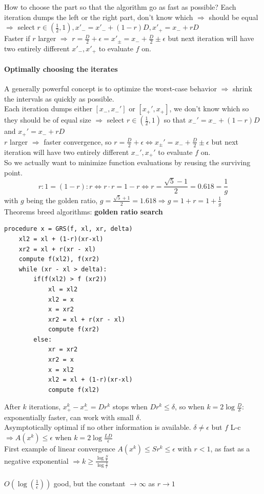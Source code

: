 \documentclass[10pt]{report}
\begin{document}
How to choose the part so that the algorithm go as fast as possible? Each iteration dumps the left or the right part, don't know which $\Rightarrow$ should be equal $\Rightarrow$ select $r \in (\frac{1}{2}, 1), x'_- = x'_- + (1 - r)D, x'_+ = x_- + rD$\\
Faster if $r$ larger $\Rightarrow$ $r = \frac{D}{2} + \epsilon = x'_\pm = x_- + \frac{D}{2} \pm \epsilon$ but next iteration will have two entirely different $x'_-, x'_+$ to evaluate $f$ on.
\paragraph{Optimally choosing the iterates} A generally powerful concept is to optimize the worst-case behavior $\Rightarrow$ shrink the intervals as quickly as possible.\\
Each iteration dumps either $[x_-, x_-']$ or $[x_+', x_+]$, we don't know which so they should be of equal size $\Rightarrow$ select $r\in (\frac{1}{2},1)$ so that $x_-' = x_- + (1-r)D$ and $x_+' = x_- + rD$\\
$r$ larger $\Rightarrow$ faster convergence, so $r = \frac{D}{2} + \epsilon \Leftrightarrow x_\pm' = x_- + \frac{D}{2}\pm\epsilon$ but next iteration will have two entirely different $x_-', x_+'$ to evaluate $f$ on.\\
So we actually want to minimize function evaluations by reusing the surviving point. $$r : 1 = (1 - r) : r \Leftrightarrow r\cdot r = 1 - r \Leftrightarrow r = \frac{\sqrt{5} - 1}{2} = 0.618 = \frac{1}{g}$$ with $g$ being the golden ratio, $g = \frac{\sqrt{5} + 1}{2} = 1.618 \Rightarrow g = 1 + r = 1 + \frac{1}{g}$\\
Theorems breed algorithms: \textbf{golden ratio search}\\
\begin{lstlisting}[style=myPython]
procedure x = GRS(f, xl, xr, delta)
	xl2 = xl + (1-r)(xr-xl)
	xr2 = xl + r(xr - xl)
	compute f(xl2), f(xr2)
	while (xr - xl > delta):
		if(f(xl2) > f (xr2))
			xl = xl2
			xl2 = x
			x = xr2
			xr2 = xl + r(xr - xl)
			compute f(xr2)
		else:
			xr = xr2
			xr2 = x
			x = xl2
			xl2 = xl + (1-r)(xr-xl)
			compute f(xl2)
\end{lstlisting}
After $k$ iterations, $x_+^k - x_-^k = Dr^k$ stops when $Dr^k \leq \delta$, so when $k = 2\log\frac{D}{\delta}$: exponentially faster, can work with small $\delta$.\\
Asymptotically optimal if no other information is available. $\delta \neq \epsilon$ but $f$ L-c $\Rightarrow A(x^k) \leq \epsilon$ when $k = 2\log\frac{LD}{\epsilon}$\\
First example of linear convergence $A(x^k) \leq Sr^k \leq \epsilon$ with $r < 1$, as fast as a negative exponential $\Rightarrow k \geq \frac{\log\frac{S}{\epsilon}}{\log\frac{1}{r}}$\\\\
$O(\log(\frac{1}{\epsilon}))$ good, but the constant $\rightarrow\infty$ as $r\rightarrow 1$
\end{document}
